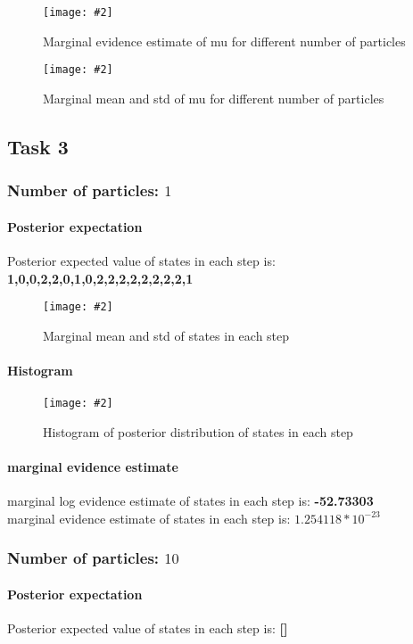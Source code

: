 \documentclass{article}
\newcommand{\centerfigcap}[3]{\begin{figure}[H]
\begin{center}\texttt{[image: \#2]} \caption{#3}\end{center}
\end{figure}}
\begin{document}
\begin{minipage}{.5\textwidth}
  \centering
\centerfigcap{1}{../Figures/Evidence_2}{Marginal evidence estimate of mu for different number of particles}
\end{minipage}%
\begin{minipage}{.5\textwidth}
  \centering
\centerfigcap{1}{../Figures/Mean-Std_2}{Marginal mean and std of mu for different number of particles}
\end{minipage}


\subsection{Task 3}
\subsubsection{Number of particles: $1$}
\paragraph{Posterior expectation}
Posterior expected value of states in each step is: \textbf{1,0,0,2,2,0,1,0,2,2,2,2,2,2,2,2,1}\\

\centerfigcap{0.6}{../Figures/Mean-Std_3_0}{Marginal mean and std of states in each step}

\paragraph{Histogram}
\centerfigcap{0.7}{../Figures/Histogram_3_0}{Histogram of posterior distribution of states in each step}
\paragraph{marginal evidence estimate}
marginal log evidence estimate of states in each step is: \textbf{-52.73303}\\
marginal evidence estimate of states in each step is: \textbf{$1.254118*10^{-23}$}\\

\subsubsection{Number of particles: $10$}
\paragraph{Posterior expectation}
Posterior expected value of states in each step is: \textbf{[]}\\
\end{document}
